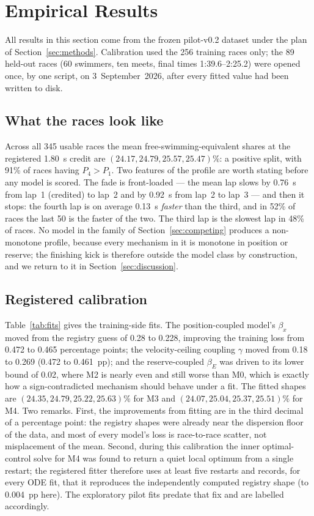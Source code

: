 \section{Empirical Results}\label{sec:results-empirical}

All results in this section come from the frozen pilot-v0.2 dataset under
the plan of Section~\ref{sec:methods}. Calibration used the 256 training
races only; the 89 held-out races (60 swimmers, ten meets, final times
1:39.6--2:25.2) were opened once, by one script, on 3~September~2026, after
every fitted value had been written to disk.

\subsection{What the races look like}

Across all 345 usable races the mean free-swimming-equivalent shares at the
registered 1.80~s credit are $(24.17, 24.79, 25.57, 25.47)\%$: a positive
split, with 91\% of races having $P_4>P_1$. Two features of the profile are
worth stating before any model is scored. The fade is front-loaded --- the
mean lap slows by 0.76~s from lap~1 (credited) to lap~2 and by 0.92~s from
lap~2 to lap~3 --- and then it stops: the fourth lap is on average
0.13~s \emph{faster} than the third, and in 52\% of races the last 50 is
the faster of the two. The third lap is the slowest lap in 48\% of races.
No model in the family of Section~\ref{sec:competing} produces a
non-monotone profile, because every mechanism in it is monotone in position
or reserve; the finishing kick is therefore outside the model class by
construction, and we return to it in Section~\ref{sec:discussion}.

\subsection{Registered calibration}

Table~\ref{tab:fits} gives the training-side fits. The position-coupled
model's $\beta_x$ moved from the registry guess of 0.28 to 0.228, improving
the training loss from 0.472 to 0.465 percentage points; the
velocity-ceiling coupling $\gamma$ moved from 0.18 to 0.269 (0.472 to
0.461~pp); and the reserve-coupled $\beta_E$ was driven to its lower bound
of 0.02, where M2 is nearly even and still worse than M0, which is exactly
how a sign-contradicted mechanism should behave under a fit. The fitted
shapes are $(24.35, 24.79, 25.22, 25.63)\%$ for M3 and
$(24.07, 25.04, 25.37, 25.51)\%$ for M4. Two remarks. First, the
improvements from fitting are in the third decimal of a percentage point:
the registry shapes were already near the dispersion floor of the data, and
most of every model's loss is race-to-race scatter, not misplacement of the
mean. Second, during this calibration the inner optimal-control solve for
M4 was found to return a quiet local optimum from a single restart; the
registered fitter therefore uses at least five restarts and records, for
every ODE fit, that it reproduces the independently computed registry shape
(to 0.004~pp here). The exploratory pilot fits predate that fix and are
labelled accordingly.


